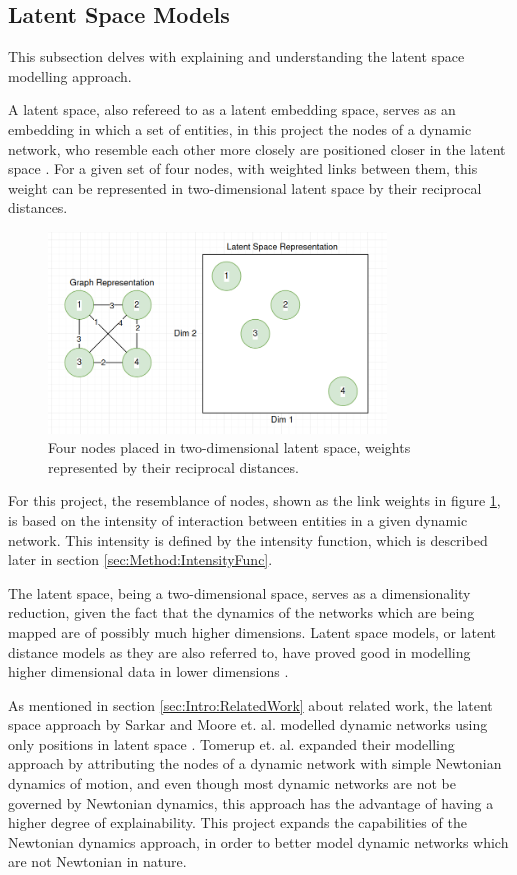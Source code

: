 \subsection{Latent Space Models}
\label{sec:Method:LSM}
This subsection delves with explaining and understanding the latent space modelling approach.

A latent space, also refereed to as a latent embedding space, serves as an embedding in which a set of entities, in this project the nodes of a dynamic network, who resemble each other more closely are positioned closer in the latent space \cite{Sarkar2005DynamicModels} \cite{Kim2017AVariables}.
For a given set of four nodes, with weighted links between them, this weight can be represented in two-dimensional latent space by their reciprocal distances.  

\begin{figure}[H]
    \centering
    \includegraphics[width=0.8\textwidth]{0_images/latentspace.png}
    \caption{Four nodes placed in two-dimensional latent space, weights represented by their reciprocal distances.}
    \label{fig:latentspace}
\end{figure}
For this project, the resemblance of nodes, shown as the link weights in figure \ref{fig:latentspace}, is based on the intensity of interaction between entities in a given dynamic network.
This intensity is defined by the intensity function, which is described later in section \ref{sec:Method:IntensityFunc}.

The latent space, being a two-dimensional space, serves as a dimensionality reduction, given the fact that the dynamics of the networks which are being mapped are of possibly much higher dimensions.
Latent space models, or latent distance models as they are also referred to, have proved good in modelling higher dimensional data in lower dimensions \cite{Gourieroux2021ScalableNetworks}.

As mentioned in section \ref{sec:Intro:RelatedWork} about related work, the latent space approach by Sarkar and Moore et. al. modelled dynamic networks using only positions in latent space \cite{Sarkar2005DynamicModels}.
Tomerup et. al. \cite{Tommerup2021LearningNetworks} expanded their modelling approach by attributing the nodes of a dynamic network with simple Newtonian dynamics of motion, and even though most dynamic networks are not be governed by Newtonian dynamics, this approach has the advantage of having a higher degree of explainability.
This project expands the capabilities of the Newtonian dynamics approach, in order to better model dynamic networks which are not Newtonian in nature.


